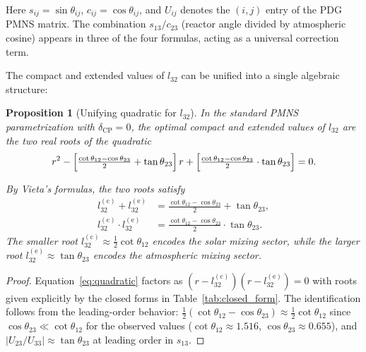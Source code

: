 \documentclass[11pt,a4paper]{article}
\newtheorem{proposition}{Proposition}
\begin{document}
\noindent
Here $s_{ij} = \sin\theta_{ij}$, $c_{ij} = \cos\theta_{ij}$,
and $U_{ij}$ denotes the $(i,j)$ entry of the PDG PMNS matrix.
The combination $s_{13}/c_{23}$ (reactor angle divided by
atmospheric cosine) appears in three of the four formulas,
acting as a universal correction term.
 
The compact and extended values of $l_{32}$ can be unified into a
single algebraic structure:
 
\begin{proposition}[Unifying quadratic for $l_{32}$]
\label{prop:quadratic}
In the standard PMNS parametrization with $\delta_{\mathrm{CP}} = 0$,
the optimal compact and extended values of $l_{32}$ are the two
real roots of the quadratic
\begin{equation}
\label{eq:quadratic}
r^2 - \Bigl[\tfrac{\cot\theta_{12} - \cos\theta_{23}}{2}
            + \tan\theta_{23}\Bigr]\,r
     + \Bigl[\tfrac{\cot\theta_{12} - \cos\theta_{23}}{2}
             \cdot \tan\theta_{23}\Bigr] = 0.
\end{equation}

By Vieta's formulas, the two roots satisfy
\begin{align}
l_{32}^{(\mathrm{c})} + l_{32}^{(\mathrm{e})}
  &= \tfrac{\cot\theta_{12} - \cos\theta_{23}}{2} + \tan\theta_{23},
  \label{eq:vieta_sum}\\
l_{32}^{(\mathrm{c})} \cdot l_{32}^{(\mathrm{e})}
  &= \tfrac{\cot\theta_{12} - \cos\theta_{23}}{2} \cdot \tan\theta_{23}.
  \label{eq:vieta_product}
\end{align}
The smaller root $l_{32}^{(\mathrm{c})} \approx \tfrac{1}{2}\cot\theta_{12}$
encodes the \emph{solar} mixing sector, while the larger root
$l_{32}^{(\mathrm{e})} \approx \tan\theta_{23}$ encodes the
\emph{atmospheric} mixing sector.
\end{proposition}
 
\begin{proof}
Equation~\eqref{eq:quadratic} factors as
$(r - l_{32}^{(\mathrm{c})})(r - l_{32}^{(\mathrm{e})}) = 0$
with roots given explicitly by the closed forms in
Table~\ref{tab:closed_form}.
The identification follows from the leading-order behavior:
$\tfrac{1}{2}(\cot\theta_{12} - \cos\theta_{23})
 \approx \tfrac{1}{2}\cot\theta_{12}$ since $\cos\theta_{23} \ll \cot\theta_{12}$
for the observed values ($\cot\theta_{12} \approx 1.516$,
$\cos\theta_{23} \approx 0.655$), and
$|U_{23}/U_{33}| \approx \tan\theta_{23}$ at leading order in $s_{13}$.
\end{proof}
 
\end{document}

